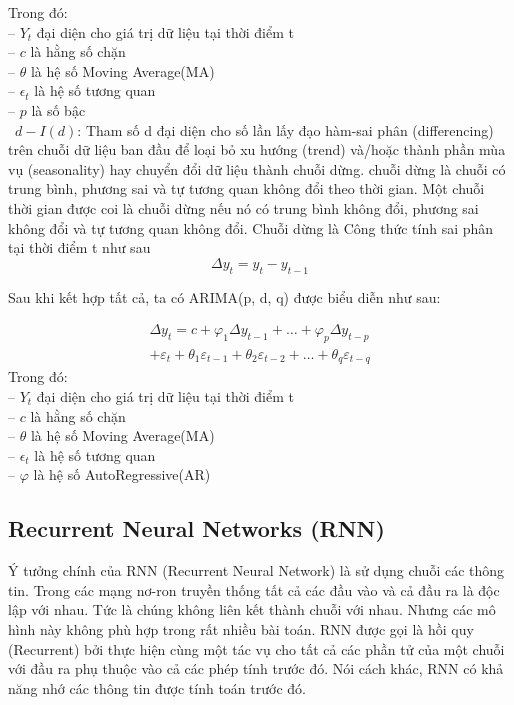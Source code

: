 \documentclass[conference]{IEEEtran}
\begin{document}
Trong đó: \\
\indent -- \(Y_t\) đại diện cho giá trị dữ liệu tại thời điểm t\\
\indent -- \(c\) là hằng số chặn\\
\indent -- \(\theta\) là hệ số Moving Average(MA)\\
\indent -- \(\epsilon_t\) là hệ số tương quan\\
\indent -- \(p\) là số bậc \\

\indent\textbullet\  \(d-I(d)\): Tham số d đại diện cho số lần lấy đạo hàm-sai phân (differencing) trên chuỗi dữ liệu ban đầu để loại bỏ xu hướng (trend) và/hoặc thành phần mùa vụ (seasonality) hay chuyển đổi dữ liệu thành chuỗi dừng. chuỗi dừng là chuỗi có trung bình, phương sai và tự tương quan không đổi theo thời gian. Một chuỗi thời gian được coi là chuỗi dừng nếu nó có trung bình không đổi, phương sai không đổi và tự tương quan không đổi. Chuỗi dừng là Công thức tính sai phân tại thời điểm t như sau
\[
    \Delta y_t = y_t - y_{t-1}
\]

Sau khi kết hợp tất cả, ta có ARIMA(p, d, q) được biểu diễn như sau:

\begin{multline}
    \Delta y_t = c + \varphi_1 \Delta y_{t-1} + \ldots + \varphi_p \Delta y_{t-p} \\
    + \varepsilon_t + \theta_1 \varepsilon_{t-1} + \theta_2 \varepsilon_{t-2}
    + \ldots + \theta_q \varepsilon_{t-q}
\end{multline}
Trong đó: \\
\indent -- \(Y_t\) đại diện cho giá trị dữ liệu tại thời điểm t\\
\indent -- \(c\) là hằng số chặn\\
\indent -- \(\theta\) là hệ số Moving Average(MA)\\
\indent -- \(\epsilon_t\) là hệ số tương quan\\
\indent -- \(\varphi\) là hệ số AutoRegressive(AR)

\subsection{Recurrent Neural Networks (RNN)}
Ý tưởng chính của RNN (Recurrent Neural Network) là sử dụng chuỗi các thông tin. Trong các mạng nơ-ron truyền thống tất cả các đầu vào và cả đầu ra là độc lập với nhau. Tức là chúng không liên kết thành chuỗi với nhau. Nhưng các mô hình này không phù hợp trong rất nhiều bài toán. RNN được gọi là hồi quy (Recurrent) bởi thực hiện cùng một tác vụ cho tất cả các phần tử của một chuỗi với đầu ra phụ thuộc vào cả các phép tính trước đó. Nói cách khác, RNN có khả năng nhớ các thông tin được tính toán trước đó.
\end{document}

